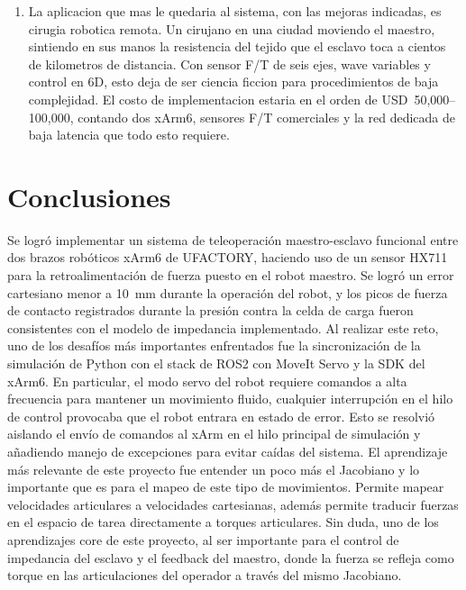 \documentclass[journal,10pt,twoside]{IEEEtran}
\begin{document}
\begin{enumerate}[label=(\alph*)]
\item La aplicacion que mas le quedaria al sistema, con las mejoras
indicadas, es cirugia robotica remota. Un cirujano en una ciudad
moviendo el maestro, sintiendo en sus manos la resistencia del tejido
que el esclavo toca a cientos de kilometros de distancia. Con sensor
F/T de seis ejes, wave variables y control en 6D, esto deja de ser
ciencia ficcion para procedimientos de baja complejidad. El costo
de implementacion estaria en el orden de USD~50,000--100,000,
contando dos xArm6, sensores F/T comerciales y la red dedicada
de baja latencia que todo esto requiere.

\end{enumerate}

\section{Conclusiones}
\label{sec:conclusions}
Se logró implementar un sistema de teleoperación maestro-esclavo funcional entre dos brazos
robóticos xArm6 de UFACTORY, haciendo uso de un sensor HX711 para la retroalimentación de fuerza
puesto en el robot maestro. Se logró un error cartesiano menor a 10~mm durante la operación del robot,
y los picos de fuerza de contacto registrados durante la presión contra la celda de carga
fueron consistentes con el modelo de impedancia implementado.
Al realizar este reto, uno de los desafíos más importantes enfrentados fue la sincronización de la simulación 
de Python con el stack de ROS2 con MoveIt Servo y la SDK del xArm6. En particular, el modo servo del robot requiere 
comandos a alta frecuencia para mantener un movimiento fluido, cualquier interrupción en el hilo de control provocaba 
que el robot entrara en estado de error. Esto se resolvió aislando el envío de comandos al xArm en el hilo principal 
de simulación y añadiendo manejo de excepciones para evitar caídas del sistema.
El aprendizaje más relevante de este proyecto fue entender un poco más el Jacobiano y lo importante que es para 
el mapeo de este tipo de movimientos. Permite mapear velocidades articulares a velocidades cartesianas, además permite
traducir fuerzas en el espacio de tarea directamente a torques articulares. Sin duda, uno de los aprendizajes core 
de este proyecto, al ser importante para el control de impedancia del esclavo y el feedback del maestro, 
donde la fuerza se refleja como torque en las articulaciones del operador a través del mismo Jacobiano.
\end{document}
